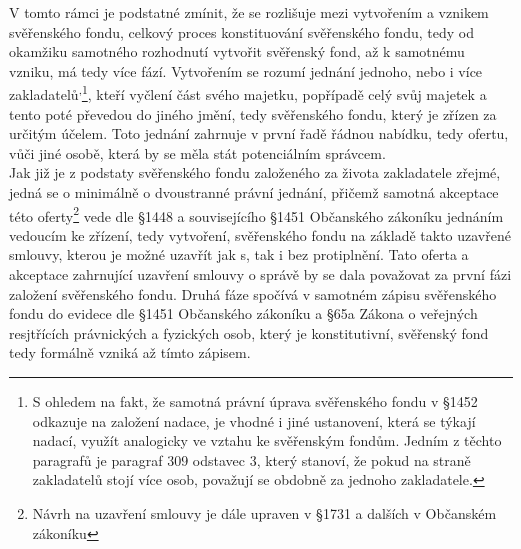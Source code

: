 \documentclass{article}
\begin{document}
V tomto rámci je podstatné zmínit, že se rozlišuje mezi vytvořením a vznikem svěřenského fondu, celkový proces konstituování svěřenského fondu, tedy od okamžiku samotného rozhodnutí vytvořit svěřenský fond, až k samotnému vzniku, má tedy více fází. Vytvořením se rozumí jednání jednoho, nebo i více zakladatelů\textsuperscript{,}\footnote{S ohledem na fakt, že samotná právní úprava svěřenského fondu v §1452 odkazuje na založení nadace, je vhodné i jiné ustanovení, která se týkají nadací, využít analogicky ve vztahu ke svěřenským fondům. Jedním z těchto paragrafů je paragraf  309 odstavec 3, který stanoví, že pokud na straně zakladatelů stojí více osob, považují se obdobně za jednoho zakladatele.}, kteří vyčlení část svého majetku, popřípadě celý svůj majetek a tento poté převedou do jiného jmění, tedy svěřenského fondu, který je zřízen za určitým účelem. Toto jednání zahrnuje v první řadě řádnou nabídku, tedy ofertu, vůči jiné osobě, která by se měla stát potenciálním správcem.\\


Jak již je z podstaty svěřenského fondu založeného za života zakladatele zřejmé, jedná se o minimálně o dvoustranné právní jednání, přičemž samotná akceptace této oferty\footnote{Návrh na uzavření smlouvy je dále upraven v §1731 a dalších v Občanském zákoníku} vede dle §1448 a souvisejícího §1451 Občanského zákoníku jednáním vedoucím ke zřízení, tedy vytvoření, svěřenského fondu na základě takto uzavřené smlouvy, kterou je možné uzavřít jak s, tak i bez protiplnění. Tato oferta a akceptace zahrnující uzavření smlouvy o správě by se dala považovat za první fázi založení svěřenského fondu. Druhá fáze spočívá v samotném zápisu svěřenského fondu do evidece dle §1451 Občanského zákoníku a §65a Zákona o veřejných resjtřících právnických a fyzických osob, který je konstitutivní, svěřenský fond tedy formálně vzniká až tímto zápisem.\\
\end{document}
